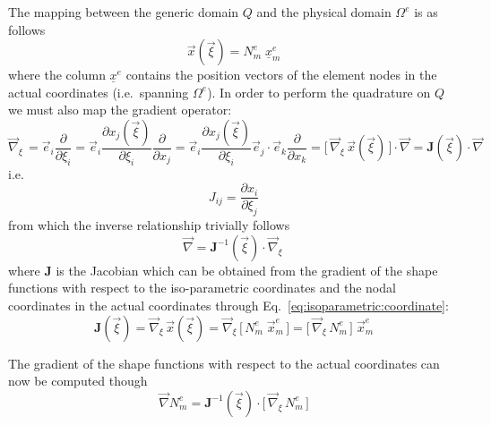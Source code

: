\documentclass[times,namecite]{goose-article}
\begin{document}
The mapping between the generic domain $Q$ and the physical domain $\Omega^e$ is as follows
\begin{equation}
\label{eq:isoparametric:coordinate}
  \vec{x} ( \vec{\xi} ) = N_m^{e} \; \underline{x}_m^e
\end{equation}
where the column $\underline{x}^e$ contains the position vectors of the element nodes in the actual coordinates (i.e.\ spanning $\Omega^e$). In order to perform the quadrature on $Q$ we must also map the gradient operator:
\begin{equation}
  \vec{\nabla}_{\xi}\,
  =
  \vec{e}_i \frac{\partial}{\partial \xi_i}
  =
  \vec{e}_i \frac{\partial x_j(\vec{\xi})}{\partial \xi_i} \frac{\partial}{\partial x_j}
  =
  \vec{e}_i \frac{\partial x_j(\vec{\xi})}{\partial \xi_i} \vec{e}_j \cdot \vec{e}_k \frac{\partial}{\partial x_k}
  =
  \big[\, \vec{\nabla}_{\xi}\, \vec{x}(\vec{\xi}) \,\big] \cdot \vec{\nabla}
  =
  \bm{J}(\vec{\xi}) \cdot \vec{\nabla}
\end{equation}
i.e.
\begin{equation}
  J_{ij} = \frac{\partial x_i}{\partial \xi_j}
\end{equation}
from which the inverse relationship trivially follows
\begin{equation}
  \vec{\nabla} = \bm{J}^{-1}(\vec{\xi}) \cdot \vec{\nabla}_{\xi}\,
\end{equation}
where $\bm{J}$ is the Jacobian which can be obtained from the gradient of the shape functions with respect to the iso-parametric coordinates and the nodal coordinates in the actual coordinates through Eq.~\eqref{eq:isoparametric:coordinate}:
\begin{equation}
  \bm{J}(\vec{\xi})
  =
  \vec{\nabla}_{\xi}\, \vec{x}(\vec{\xi})
  =
  \vec{\nabla}_{\xi}\, \big[\, N_m^{e} \; \vec{x}_m^e \,\big]
  =
  \big[\, \vec{\nabla}_{\xi}\, N_m^{e} \,\big] \; \vec{x}_m^e
\end{equation}

The gradient of the shape functions with respect to the actual coordinates can now be computed though
\begin{equation}
  \vec{\nabla} N_m^{e}
  =
  \bm{J}^{-1}(\vec{\xi}) \cdot  \big[\, \vec{\nabla}_{\xi}\, N_m^{e} \,\big]
\end{equation}
\end{document}
